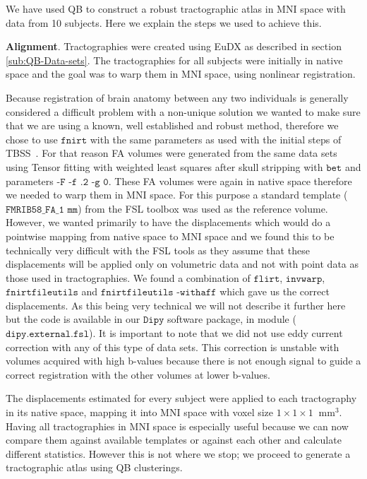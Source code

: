 \documentclass[preprint,authoryear,a4paper,10pt,onecolumn]{elsarticle}
\begin{document}
We have used QB to construct a robust tractographic atlas in MNI space
with data from 10 subjects. Here we explain the steps we used to achieve
this.

\textbf{Alignment}. Tractographies were created using EuDX as described
in section \ref{sub:QB-Data-sets}. The tractographies for all subjects
were initially in native space and the goal was to warp them in MNI
space, using nonlinear registration.

Because registration of brain anatomy between any two individuals is generally
considered a difficult problem with a non-unique solution we wanted to make sure
that we are using a known, well established and robust method, therefore we
chose to use $\texttt{fnirt}$ with the same parameters as used with the initial
steps of TBSS~\citep{Smith2006NeuroImage}. For that reason FA volumes were
generated from the same data sets using Tensor fitting with weighted least
squares after skull stripping with $\texttt{bet}$ and parameters $\texttt{-F -f
.2 -g 0}$. These FA volumes were again in native space therefore we needed to
warp them in MNI space. For this purpose a standard template
($\texttt{FMRIB58\_FA\_1~mm}$) from the FSL toolbox was used as the reference
volume. However, we wanted primarily to have the displacements which would do a
pointwise mapping from native space to MNI space and we found this to be
technically very difficult with the FSL tools as they assume that these
displacements will be applied only on volumetric data and not with point data as
those used in tractographies. We found a combination of $\texttt{flirt}$,
$\texttt{invwarp}$, $\texttt{fnirtfileutils}$ and $\texttt{fnirtfileutils
-withaff}$ which gave us the correct displacements. As this being very technical
we will not describe it further here but the code is available in our
$\texttt{Dipy}$ software package, in module ($\texttt{dipy.external.fsl}$). It
is important to note that we did not use eddy current correction with any of
this type of data sets. This correction is unstable with volumes acquired with
high b-values because there is not enough signal to guide a correct registration
with the other volumes at lower b-values.

The displacements estimated for every subject were applied
to each tractography in its native space, mapping it into MNI
space with voxel size $1\times1\times1~\textrm{~mm}^{3}$. Having all
tractographies in MNI space is especially useful because we can now
compare them against available templates or against each other and
calculate different statistics. However this is not where we stop; we
proceed to generate a tractographic atlas using QB clusterings.
\end{document}

